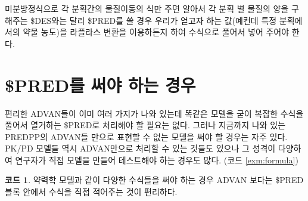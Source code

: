 \documentclass[
  10pt,
  krantz2,
  a4paper]{krantz}
\newenvironment{Shaded}{\begin{snugshade}}{\end{snugshade}}
\newcommand{\DecValTok}[1]{\textcolor[rgb]{0.00,0.00,0.81}{#1}}
\newcommand{\ErrorTok}[1]{\textcolor[rgb]{0.64,0.00,0.00}{\textbf{#1}}}
\newcommand{\KeywordTok}[1]{\textcolor[rgb]{0.13,0.29,0.53}{\textbf{#1}}}
\newcommand{\NormalTok}[1]{#1}
\newcommand{\OperatorTok}[1]{\textcolor[rgb]{0.81,0.36,0.00}{\textbf{#1}}}
\newcommand{\StringTok}[1]{\textcolor[rgb]{0.31,0.60,0.02}{#1}}
\theoremstyle{definition}
\theoremstyle{definition}
\newtheorem{example}{코드}[chapter]
\theoremstyle{definition}
\theoremstyle{remark}
\begin{document}
미분방정식으로 각 분획간의 물질이동의 식만 주면 알아서 각 분획 별 물질의 양을 구해주는 \$DES와는 달리 \$PRED를 쓸 경우 우리가 얻고자 하는 값(예컨데 특정 분획에서의 약물 농도)을 라플라스 변환을 이용하든지 하여 수식으로 풀어서 넣어 주어야 한다.

\hypertarget{preduxb97c-uxc368uxc57c-uxd558uxb294-uxacbduxc6b0}{%
\section{\$PRED를 써야 하는 경우}\label{preduxb97c-uxc368uxc57c-uxd558uxb294-uxacbduxc6b0}}

편리한 ADVAN들이 이미 여러 가지가 나와 있는데 똑같은 모델을 굳이 복잡한 수식을 풀어서 열거하는 \$PRED로 처리해야 할 필요는 없다. 그러나 지금까지 나와 있는 PREDPP의 ADVAN들 만으로 표현할 수 없는 모델을 써야 할 경우는 자주 있다. PK/PD 모델들 역시 ADVAN만으로 처리할 수 있는 것들도 있으나 그 성격이 다양하여 연구자가 직접 모델을 만들어 테스트해야 하는 경우도 많다. (코드 \ref{exm:formula})

\begin{example}
\protect\hypertarget{exm:formula}{}{\label{exm:formula} }약력학 모델과 같이 다양한 수식들을 써야 하는 경우 ADVAN 보다는 \$PRED 블록 안에서 수식을 직접 적어주는 것이 편리하다.
\end{example}

\begin{Shaded}
\end{Shaded}
\end{document}
